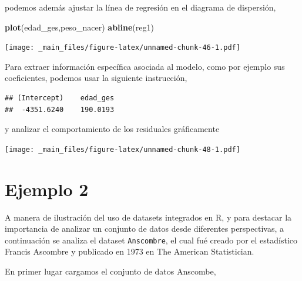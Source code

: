 \documentclass[
]{book}
\newenvironment{Shaded}{\begin{snugshade}}{\end{snugshade}}
\newcommand{\AttributeTok}[1]{\textcolor[rgb]{0.13,0.29,0.53}{#1}}
\newcommand{\DecValTok}[1]{\textcolor[rgb]{0.00,0.00,0.81}{#1}}
\newcommand{\FunctionTok}[1]{\textcolor[rgb]{0.13,0.29,0.53}{\textbf{#1}}}
\newcommand{\NormalTok}[1]{#1}
\newcommand{\SpecialCharTok}[1]{\textcolor[rgb]{0.81,0.36,0.00}{\textbf{#1}}}
\begin{document}
podemos además ajustar la línea de regresión en el diagrama de dispersión,

\begin{Shaded}
\begin{Highlighting}[]
\FunctionTok{plot}\NormalTok{(edad\_ges,peso\_nacer)}
\FunctionTok{abline}\NormalTok{(reg1)}
\end{Highlighting}
\end{Shaded}

\texttt{[image: \_main\_files/figure-latex/unnamed-chunk-46-1.pdf]}

Para extraer información específica asociada al modelo, como por ejemplo sus coeficientes, podemos usar la siguiente instrucción,

\begin{Shaded}
\end{Shaded}

\begin{verbatim}
## (Intercept)    edad_ges 
##  -4351.6240    190.0193
\end{verbatim}

y analizar el comportamiento de los residuales gráficamente

\begin{Shaded}
\end{Shaded}

\texttt{[image: \_main\_files/figure-latex/unnamed-chunk-48-1.pdf]}

\hypertarget{ejemplo-2-1}{%
\section{Ejemplo 2}\label{ejemplo-2-1}}

A manera de ilustración del uso de datasets integrados en R, y para destacar la importancia de analizar un conjunto de datos desde diferentes perspectivas, a continuación se analiza el dataset \texttt{Anscombre}, el cual fué creado por el estadístico Francis Ascombre y publicado en 1973 en The American Statistician.

En primer lugar cargamos el conjunto de datos Anscombe,
\end{document}
